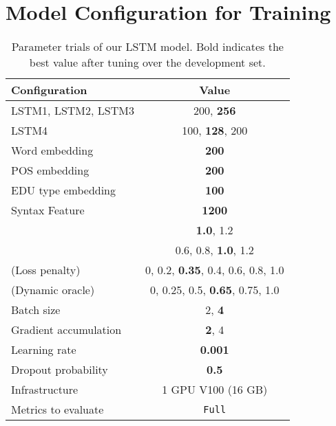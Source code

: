\documentclass[11pt,a4paper]{article}
\begin{document}
\vfill\eject
\section{Model Configuration for Training}
\label{sec:appendix}

\begin{table}[h]
  \centering
  \begin{adjustbox}{max width=1\linewidth}
    \begin{tabular}{lc}
      \toprule
      \textbf{Configuration} & \textbf{Value} \\
      \midrule
      LSTM1, LSTM2, LSTM3 & 200, \textbf{256} \\
      LSTM4 & 100, \textbf{128}, 200 \\
      Word embedding & \textbf{200} \\
      POS embedding & \textbf{200} \\
      EDU type embedding & \textbf{100} \\
      Syntax Feature & \textbf{1200} \\
       & \textbf{1.0}, 1.2 \\
       & 0.6, 0.8, \textbf{1.0}, 1.2 \\
       (Loss penalty) & 0, 0.2, \textbf{0.35}, 0.4, 0.6, 0.8, 1.0 \\
       (Dynamic oracle) & 0, 0.25, 0.5, \textbf{0.65}, 0.75, 1.0 \\
      Batch size & 2, \textbf{4} \\
      Gradient accumulation & \textbf{2}, 4 \\
      Learning rate & \textbf{0.001} \\
      Dropout probability & \textbf{0.5} \\
      Infrastructure & 1 GPU V100 (16 GB) \\
      Metrics to evaluate & \texttt{Full} \\
      \bottomrule
    \end{tabular}
  \end{adjustbox}
  \caption{\label{app1} Parameter trials of our LSTM model. Bold
    indicates the best value after tuning over the development set. }
\end{table}
\end{document}
